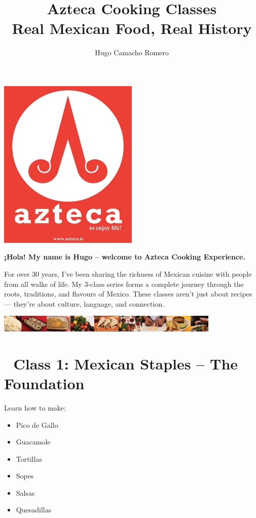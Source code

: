 \documentclass[12pt]{article}
\title{\Huge \textbf{Azteca Cooking Classes}\\[1ex] \Large Real Mexican Food, Real History}
\author{\Large Hugo Camacho Romero}
\date{}
\begin{document}
\maketitle

\begin{center}
\includegraphics[width=0.5\textwidth]{assets/images/azteca-logo.png}
\end{center}

\noindent
\textbf{¡Hola! My name is Hugo – welcome to Azteca Cooking Experience.}

For over 30 years, I’ve been sharing the richness of Mexican cuisine with people from all walks of life. My 3-class series forms a complete journey through the roots, traditions, and flavours of Mexico. These classes aren’t just about recipes — they’re about culture, language, and connection.

\vspace{1em}
\begin{center}
\includegraphics[width=0.8\textwidth]{assets/images/food_belt.JPG}
\end{center}

\section*{🌽 Class 1: Mexican Staples – The Foundation}

Learn how to make:
\begin{itemize}
\item Pico de Gallo
\item Guacamole
\item Tortillas
\item Sopes
\item Salsas
\item Quesadillas
\end{itemize}
\end{document}
